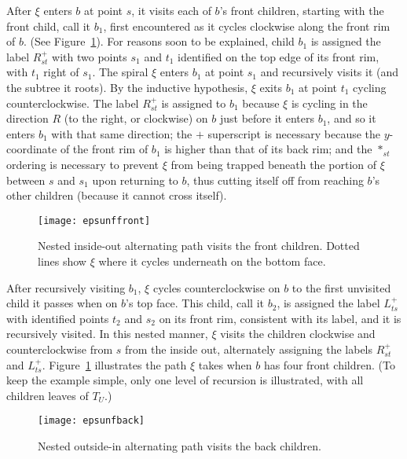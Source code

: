 \documentclass[11pt]{article}
\def\nothing{\ast}
\begin{document}
After $\xi$ enters $b$ at point $s$,
it visits each of
$b$'s front children,
starting with the front child, call it $b_1$,
first encountered as it cycles clockwise along the front rim of $b$.
(See Figure~\ref{fig:epsfrontchildren}).
For reasons soon to be explained,
child $b_1$ is assigned the label $R^{+}_{st}$ with two points
$s_1$ and $t_1$ identified on the top edge of its front rim, with $t_1$
right of $s_1$.
The spiral $\xi$
enters $b_1$ at point $s_1$ and recursively visits it (and the subtree
it roots).
By the inductive hypothesis, $\xi$ exits $b_1$ at point $t_1$ cycling counterclockwise.
The label $R^{+}_{st}$ is assigned to $b_1$ because
$\xi$ is cycling in the direction $R$ (to the right, or clockwise)
on $b$ just before it enters $b_1$, and so it enters
$b_1$ with that same direction; the $+$ superscript is necessary
because the $y$-coordinate of the front rim of $b_1$ is higher than
that of its back rim; and the
$\nothing_{st}$ ordering is necessary to prevent $\xi$ from being
trapped beneath the portion of $\xi$ between $s$ and $s_1$ upon
returning to $b$, thus cutting itself off from reaching $b$'s other children
(because it cannot cross itself).


\begin{figure}[htbp]
\centering
\texttt{[image: epsunffront]}
\caption{Nested inside-out alternating path visits the front children. Dotted lines show $\xi$
where it cycles underneath on the bottom face.}
\label{fig:epsfrontchildren}
\end{figure}


After recursively visiting $b_1$, $\xi$ cycles counterclockwise on $b$
to the first unvisited child it passes when on $b$'s top face. This child, call it $b_2$,
is assigned the label $L^{+}_{ts}$ with identified points $t_2$ and $s_2$ on its front
rim, consistent with its label,  and it is recursively visited.
In this nested manner, $\xi$ visits the
children clockwise and counterclockwise from $s$ from the inside out,
alternately assigning the labels $R^{+}_{st}$ and $L^{+}_{ts}$.
Figure~\ref{fig:epsfrontchildren} illustrates the path $\xi$ takes
when $b$ has four
front children. (To keep the example simple, only
one level of recursion is illustrated, with all children leaves of $T_U$.)

\begin{figure}[htbp]
\centering
\texttt{[image: epsunfback]}
\caption{Nested outside-in alternating path visits the back children.}
\label{fig:epsbackchildren}
\end{figure}
\end{document}
